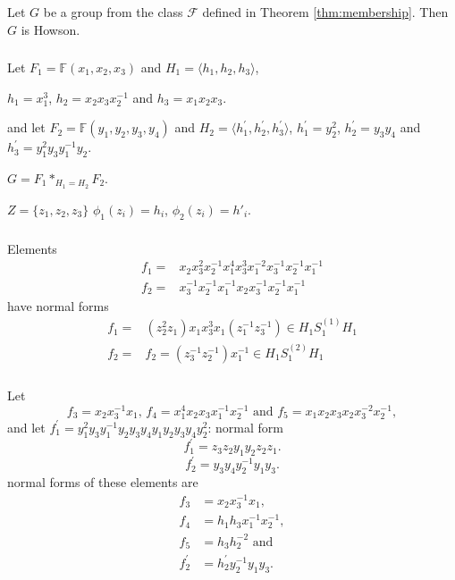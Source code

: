 \documentclass[envcountsect,compress]{beamer}
\theoremstyle{definition}
\numberwithin{equation}{section}
\newcommand{\FF}{\mathbb{F}}
\newcommand{\cF}{{\mathcal{F}}}
\newcommand{\la}{\langle}
\newcommand{\ra}{\rangle}
\begin{document}
\begin{frame}
  \frametitle{}
\begin{theorem}\label{thm:howson}
Let $G$ be a group from the class $\cF$ defined in Theorem \ref{thm:membership}.
Then $G$ is Howson. 
\end{theorem}
\end{frame}
\begin{frame}
  \frametitle{}
Let $F_1=\FF(x_1,x_2,x_3)$ and $H_1=\la h_1,h_2,h_3\ra$, 

 $h_1= x_1^3$, $h_2=x_2x_3x_2^{-1}$ and
$h_3=x_1x_2x_3$.


and let $F_2=\FF(y_1,y_2,y_3,y_4)$ and
$H_2=\la h_1^\prime, h_2^\prime, h_3^\prime\ra$, 
$h_1^{\prime}=y_2^2$,
$h_2^{\prime}=y_3y_4$ and
$h_3^{\prime}=y_1^2y_3y_1^{-1}y_2$.

$G=F_1\ast_{H_1=H_2} F_2$.

$Z=\{z_1,z_2,z_3\}$
$\phi_1(z_i)=h_i$, $\phi_2(z_i)=h'_i$.

\end{frame}
\begin{frame}
  \frametitle{}
Elements 
\begin{align*}
f_1 = &x_2x_3^2x_2^{-1} x_1^4x_3^3x_1^{-2}x_3^{-1}x_2^{-1}x_1^{-1} \\
f_2=&x_3^{-1}x_2^{-1}x_1^{-1}x_2x_3^{-1}x_2^{-1}x_1^{-1}
\end{align*}
have normal forms
\begin{align*}
f_1= & (z_2^{2}z_1) x_1x_3^3x_1(z_1^{-1}z_3^{-1})\in H_1S_1^{(1)}H_1\\
f_2= & f_2=(z_3^{-1}z_2^{-1}) x_1^{-1}\in H_1S_1^{(2)}H_1
\end{align*}

\end{frame}
\begin{frame}
  \frametitle{}
Let
\[f_3=x_2x_3^{-1}x_1,\, f_4= x_1^4 x_2 x_3 x_1^{-1} x_2^{-1}
\textrm{ and } f_5=x_1x_2x_3x_2x_3^{-2}x_2^{-1},\]
and let
 $f_1^\prime=y_1^2y_3y_1^{-1}y_2y_3y_4y_1y_2
y_3y_4y_2^2$:
normal form
\[f_1^\prime=z_3z_2 y_1y_2 z_2 z_1.\]
\[ f_2^\prime =y_3y_4y_2^{-1}y_1y_3.\]
normal forms of these elements are
\begin{align*}
f_3 & = x_2x_3^{-1}x_1,\\
f_4 &= h_1h_3 x_1^{-1}x_2^{-1},\\
f_5 &= h_3h_2^{-2}\textrm{ and }\\
f_2^\prime &= h_2^\prime y_2^{-1}y_1y_3.
\end{align*}
\end{frame}
\end{document}
